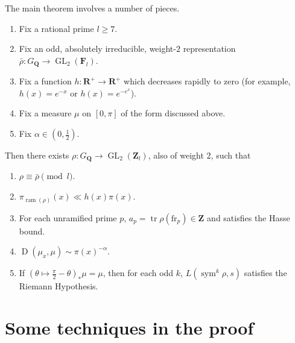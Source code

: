 \documentclass{article}
\DeclareMathOperator{\D}{D}
\DeclareMathOperator{\GL}{GL}
\DeclareMathOperator{\ram}{ram}
\DeclareMathOperator{\sym}{sym}
\DeclareMathOperator{\tr}{tr}
\newcommand{\bF}{\mathbf{F}}
\newcommand{\bQ}{\mathbf{Q}}
\newcommand{\bR}{\mathbf{R}}
\newcommand{\bZ}{\mathbf{Z}}
\newcommand{\frob}{\mathrm{fr}}
\begin{document}
The main theorem involves a number of pieces.
\begin{enumerate}
\item
Fix a rational prime $l\geqslant 7$. 

\item
Fix an odd, absolutely irreducible, weight-$2$ representation 
$\bar\rho\colon G_\bQ \to \GL_2(\bF_l)$. 

\item
Fix a function $h\colon \bR^+ \to \bR^+$ which decreases rapidly to zero (for 
example, $h(x) = e^{-x}$ or $h(x) = e^{-e^x}$). 

\item
Fix a measure $\mu$ on $[0,\pi]$ of the form discussed above. 

\item
Fix $\alpha\in \left(0,\frac 1 2\right)$. 
\end{enumerate}
Then there exists $\rho\colon G_\bQ \to \GL_2(\bZ_l)$, also of weight $2$, 
such that 
\begin{enumerate}
\item
$\rho\equiv \bar\rho\pmod l$. 

\item
$\pi_{\ram(\rho)}(x) \ll h(x) \pi(x)$. 

\item
For each unramified prime $p$, $a_p = \tr \rho(\frob_p)\in \bZ$ and satisfies 
the Hasse bound. 

\item
$\D(\mu_x,\mu) \sim \pi(x)^{-\alpha}$. 

\item
If $(\theta\mapsto \frac \pi 2 - \theta)_\ast \mu = \mu$, then for each odd 
$k$, $L(\sym^k \rho,s)$ satisfies the Riemann Hypothesis. 
\end{enumerate}





\section{Some techniques in the proof}
\end{document}
